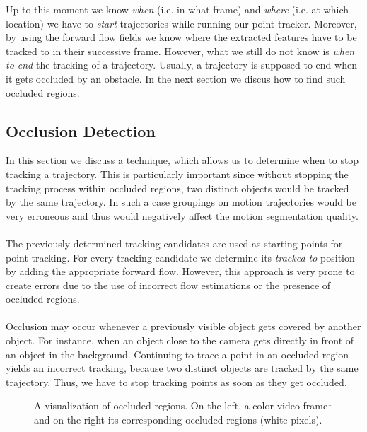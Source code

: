 Up to this moment we know \textit{when} (i.e. in what frame) and \textit{where} (i.e. at which location) we have to \textit{start} trajectories while running our point tracker. Moreover, by using the forward flow fields we know where the extracted features have to be tracked to in their successive frame. However, what we still do not know is \textit{when to end} the tracking of a trajectory. Usually, a trajectory is supposed to end when it gets occluded by an obstacle. In the next section we discus how to find such occluded regions.

\subsection{Occlusion Detection}
\label{sec:occlusion_det}
In this section we discuss a technique, which allows us to determine when to stop tracking a trajectory. This is particularly important since without stopping the tracking process within occluded regions, two distinct objects would be tracked by the same trajectory. In such a case groupings on motion trajectories would be very erroneous and thus would negatively affect the motion segmentation quality. \\ \\
The previously determined tracking candidates are used as starting points for point tracking. For every tracking candidate we determine its \textit{tracked to} position by adding the appropriate forward flow. However, this approach is very prone to create errors due to the use of incorrect flow estimations or the presence of occluded regions. \\ \\
Occlusion may occur whenever a previously visible object gets covered by another object. For instance, when an object close to the camera gets directly in front of an object in the background. Continuing to trace a point in an occluded region yields an incorrect tracking, because two distinct objects are tracked by the same trajectory. Thus, we have to stop tracking points as soon as they get occluded.
\begin{figure}[H]
\begin{center}
\end{center}
\caption[Occluded Regions]{A visualization of occluded regions. On the left, a color video frame$\footnotemark$ and on the right its corresponding occluded regions (white pixels).}
\label{fig:invalid_regions}
\end{figure}

